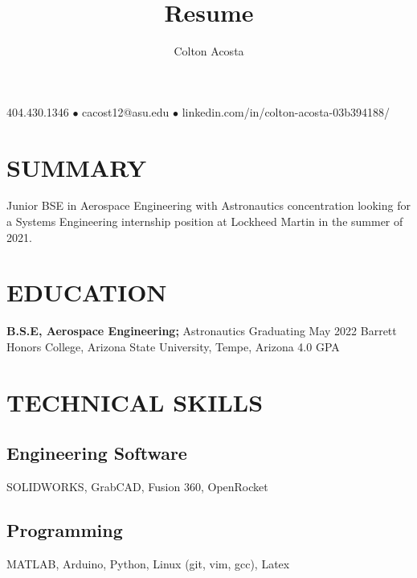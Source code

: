 \documentclass{article}
\makeatletter
\renewcommand{\maketitle}{
	\begin{center}
		{\huge\bfseries
			\theauthor}
			
		404.430.1346 $\bullet$ cacost12@asu.edu $\bullet$ linkedin.com/in/colton-acosta-03b394188/
	\end{center}
}
\makeatother
\begin{document}
\title{Resume}
\author{Colton Acosta}
\maketitle
\section{SUMMARY}
Junior BSE in Aerospace Engineering with Astronautics concentration looking for a Systems Engineering internship position at Lockheed Martin in the summer of 2021.
\section{EDUCATION}
\textbf{B.S.E, Aerospace Engineering;} Astronautics
\hfill 
Graduating May 2022
\linebreak
Barrett Honors College, Arizona State University, Tempe, Arizona 
\hfill
4.0 GPA
\section{TECHNICAL SKILLS}
\subsection{Engineering Software}
SOLIDWORKS, GrabCAD, Fusion 360, OpenRocket 
\subsection{Programming} 
MATLAB, Arduino, Python, Linux (git, vim, gcc), Latex
\end{document}

